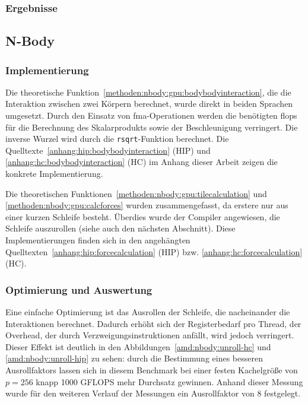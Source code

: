 \subsubsection{Ergebnisse}

\subsection{N-Body}

\subsubsection{Implementierung}

Die theoretische Funktion~\ref{methoden:nbody:gpu:bodybodyinteraction}, die die
Interaktion zwischen zwei Körpern berechnet, wurde direkt in beiden Sprachen
umgesetzt. Durch den Einsatz von \gls{fma}-Operationen werden die benötigten
\gls{flops} für die Berechnung des Skalarprodukts sowie der Beschleunigung
verringert. Die inverse Wurzel wird durch die \texttt{rsqrt}-Funktion berechnet.
Die Quelltexte~\ref{anhang:hip:bodybodyinteraction} (HIP) und
\ref{anhang:hc:bodybodyinteraction} (HC) im Anhang dieser Arbeit zeigen die
konkrete Implementierung.

Die theoretischen Funktionen~\ref{methoden:nbody:gpu:tilecalculation} und
\ref{methoden:nbody:gpu:calcforces} wurden zusammengefasst, da erstere
nur aus einer kurzen Schleife besteht. Überdies wurde der Compiler angewiesen,
die Schleife auszurollen (siehe auch den nächsten Abschnitt). Diese
Implementierungen finden sich in den angehängten
Quelltexten~\ref{anhang:hip:forcecalculation} (HIP) bzw.
\ref{anhang:hc:forcecalculation} (HC).

\subsubsection{Optimierung und Auswertung}

Eine einfache Optimierung ist das Ausrollen der Schleife, die nacheinander die
Interaktionen berechnet. Dadurch erhöht sich der Registerbedarf pro Thread, der
Overhead, der durch Verzweigungsinstruktionen anfällt, wird jedoch verringert.
Dieser Effekt ist deutlich in den Abbildungen~\ref{amd:nbody:unroll-hc} und
\ref{amd:nbody:unroll-hip} zu sehen:  durch die Bestimmung eines besseren
Ausrollfaktors lassen sich in diesem Benchmark bei einer festen Kachelgröße von
$p = 256$ knapp \num{1000} GFLOPS mehr Durchsatz gewinnen. Anhand dieser Messung
wurde für den weiteren Verlauf der Messungen ein Ausrollfaktor von 8 festgelegt.

